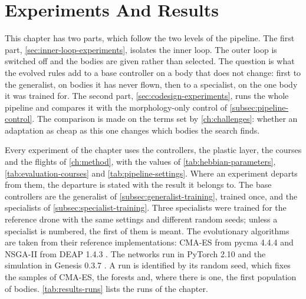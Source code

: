 \chapter{Experiments And Results}
\label{ch:results}

This chapter has two parts, which follow the two levels of the pipeline. The first part, \autoref{sec:inner-loop-experiments}, isolates the inner loop. The outer loop is switched off and the bodies are given rather than selected. The question is what the evolved rules add to a base controller on a body that does not change: first to the generalist, on bodies it has never flown, then to a specialist, on the one body it was trained for. The second part, \autoref{sec:codesign-experiments}, runs the whole pipeline and compares it with the morphology-only control of \autoref{subsec:pipeline-control}. The comparison is made on the terms set by \autoref{ch:challenges}: whether an adaptation as cheap as this one changes which bodies the search finds.

Every experiment of the chapter uses the controllers, the plastic layer, the courses and the flights of \autoref{ch:method}, with the values of \autoref{tab:hebbian-parameters}, \autoref{tab:evaluation-courses} and \autoref{tab:pipeline-settings}. Where an experiment departs from them, the departure is stated with the result it belongs to. The base controllers are the generalist of \autoref{subsec:generalist-training}, trained once, and the specialists of \autoref{subsec:specialist-training}. Three specialists were trained for the reference drone with the same settings and different random seeds; unless a specialist is numbered, the first of them is meant. The evolutionary algorithms are taken from their reference implementations: CMA-ES from pycma 4.4.4 \cite{hansen2019pycma} and NSGA-II from DEAP 1.4.3 \cite{fortin2012deap}. The networks run in PyTorch 2.10 \cite{paszke2019pytorch} and the simulation in Genesis 0.3.7 \cite{genesis2024}. A run is identified by its random seed, which fixes the samples of CMA-ES, the forests and, where there is one, the first population of bodies. \autoref{tab:results-runs} lists the runs of the chapter.

